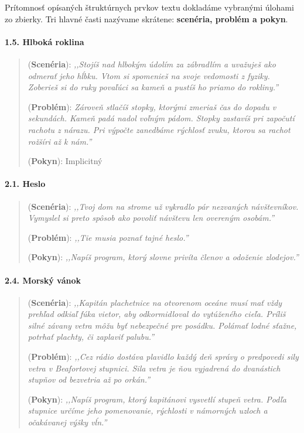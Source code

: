 Prítomnosť opísaných štruktúrnych prvkov textu dokladáme vybranými úlohami zo zbierky. Tri hlavné časti nazývame skrátene: \textbf{scenéria, problém a pokyn}.

\paragraph{1.5. Hlboká roklina}
\begin{quote}
(\textbf{Scenéria}): \textit{\small ,,Stojíš nad hlbokým údolím za zábradlím a uvažuješ ako odmerať jeho hĺbku. Vtom si spomenieš na svoje vedomosti z fyziky. Zoberieš si do ruky povaľúci sa kameň a pustíš ho priamo do rokliny.''}

(\textbf{Problém}):  \textit{\small Zároveň stlačíš stopky, ktorými zmeriaš čas do dopadu v sekundách. Kameň padá nadol voľným pádom. Stopky zastavíš pri započutí rachotu z nárazu.
Pri výpočte zanedbáme rýchlosť zvuku, ktorou sa rachot rožšíri až k nám.''}

(\textbf{Pokyn}): Implicitný
\end{quote}

\paragraph{2.1. Heslo}
\begin{quote}
(\textbf{Scenéria}): \textit{\small ,,Tvoj dom na strome už vykradlo pár nezvaných návštevníkov. Vymyslel si preto spôsob ako povoliť návštevu len overeným osobám.''}

(\textbf{Problém}): \textit{\small ,,Tie musia poznať tajné heslo.''}

(\textbf{Pokyn}): \textit{\small ,,Napíš program, ktorý slovne privíta členov a odoženie zlodejov.''}
\end{quote}

\paragraph{2.4. Morský vánok}
\begin{quote}
(\textbf{Scenéria}): \textit{\small ,,Kapitán plachetnice na otvorenom oceáne musí mať vždy prehľad odkiaľ fúka vietor, aby odkormidloval do vytúženého cieľa. Príliš silné závany vetra môžu byť nebezpečné pre posádku. Polámať lodné sťažne, potrhať plachty, či zaplaviť palubu.''}

(\textbf{Problém}): \textit{\small ,,Cez rádio dostáva plavidlo každý deň správy o predpovedi sily vetra v Beafortovej stupnici. Sila vetra je ňou vyjadrená do dvanástich stupňov od bezvetria až po orkán.''}

(\textbf{Pokyn}): \textit{\small ,,Napíš program, ktorý kapitánovi vysvetlí stupeň vetra. Podľa stupnice určíme jeho pomenovanie, rýchlosti v námorných uzloch a očakávanej výšky vĺn.''}
\end{quote}

